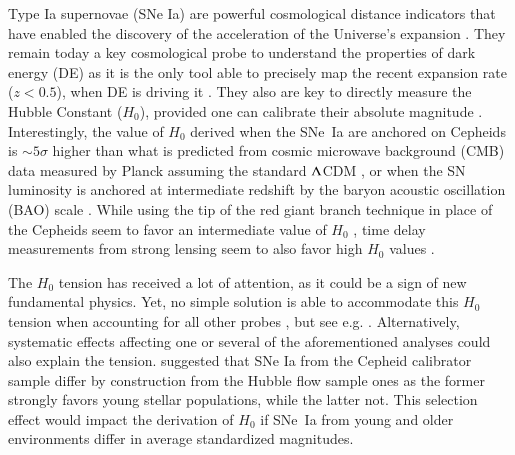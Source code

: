 \documentclass[]{aa}
\begin{document}
Type Ia supernovae (SNe Ia) are powerful cosmological distance indicators that
have enabled the discovery of the acceleration of the Universe's expansion
\citep{riess1998, perlmutter1999}. They remain today a key cosmological probe to
understand the properties of dark energy (DE) as it is the only tool able to
precisely map the recent expansion rate ($z<0.5$), when DE is driving it
\citep[e.g.][]{scolnicastro2020}. They also are key to directly measure the
Hubble Constant ($H_0$), provided one can calibrate their absolute magnitude
\citep{riess2016, freedman2019}. Interestingly, the value of $H_0$ derived when
the SNe~Ia are anchored on Cepheids \citep[the SH0ES project,][]{riess2009,
riess2016} is $\sim5\sigma$ higher than what is predicted from cosmic microwave
background (CMB) data measured by Planck assuming the standard $\Lambda$CDM
\citep{planck2018, riess2019, reid2019}, or when the SN luminosity is anchored
at intermediate redshift by the baryon acoustic oscillation (BAO) scale
\citep{feeney2019}. While using the tip of the red giant branch technique in
place of the Cepheids seem to favor an intermediate value of $H_0$
\citep{freedman2019, freedman2020}, time delay measurements from strong lensing
seem to also favor high $H_0$ values \citep{wong2019}.

The $H_0$ tension has received a lot of attention, as it could be a sign of new
fundamental physics. Yet, no simple solution is able to accommodate this $H_0$
tension when accounting for all other probes \citep{knox2019}, but see e.g.
\cite{poulin2019}. Alternatively, systematic effects affecting one or several
of the aforementioned analyses could also explain the tension.
\cite{rigault2015} suggested that SNe Ia from the Cepheid calibrator sample
differ by construction from the Hubble flow sample ones as the former
strongly favors young stellar populations, while the latter not. This
selection effect would impact the derivation of $H_0$ if SNe~Ia from young and
older environments differ in average standardized magnitudes. 
\end{document}
